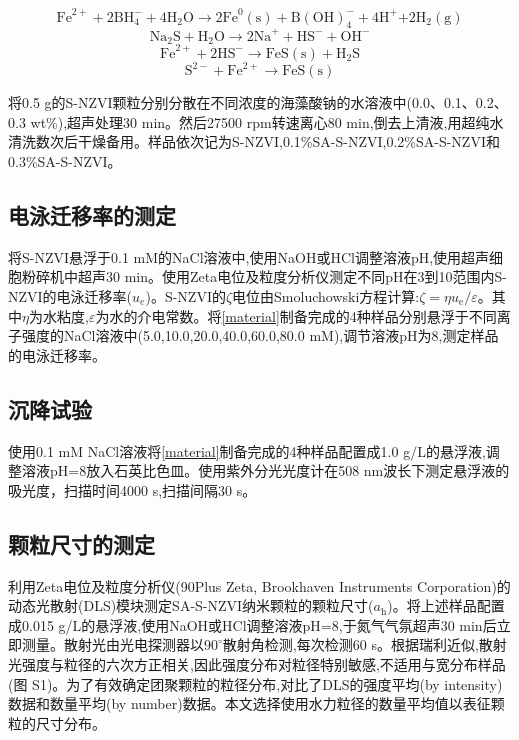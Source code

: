 \begin{equation}\label{eq1}
    \mathrm{{Fe}^{2+}+2{BH}_4^-+4H_2O}\rightarrow \mathrm{2{Fe}^0\left(s\right)+{B\left(OH\right)}_4^-+4H^+}\mathrm{+2H_2\left(g\right)}
\end{equation}
\begin{equation}
    \mathrm{{Na}_2S+H_2O\rightarrow2{Na}^++{HS}^-+{OH}^-}
\end{equation}
\begin{equation}
    \mathrm{{Fe}^{2+}+2{HS}^-\rightarrow FeS(s)+H_2S}
\end{equation}
\begin{equation}\label{e16}
    \mathrm{S^{2-}+{Fe}^{2+}\rightarrow FeS(s)}
\end{equation}

将0.5 g的S-NZVI颗粒分别分散在不同浓度的海藻酸钠的水溶液中(0.0、0.1、0.2、0.3 wt\%),超声处理30 min。然后27500 rpm转速离心80 min,倒去上清液,用超纯水清洗数次后干燥备用。样品依次记为S-NZVI,0.1\%SA-S-NZVI,0.2\%SA-S-NZVI和0.3\%SA-S-NZVI。

\subsection{电泳迁移率的测定}

将S-NZVI悬浮于0.1 mM的NaCl溶液中,使用NaOH或HCl调整溶液pH,使用超声细胞粉碎机中超声30 min。使用Zeta电位及粒度分析仪测定不同pH在3到10范围内S-NZVI的电泳迁移率($u_e$)。S-NZVI的$\zeta$电位由Smoluchowski方程计算:$\zeta=\eta u_\mathrm{e}/\varepsilon$。其中$\eta$为水粘度,$\varepsilon$为水的介电常数。将\cref{material}制备完成的4种样品分别悬浮于不同离子强度的NaCl溶液中(5.0,10.0,20.0,40.0,60.0,80.0 mM),调节溶液pH为8,测定样品的电泳迁移率。

\subsection{沉降试验}

使用0.1 mM NaCl溶液将\cref{material}制备完成的4种样品配置成1.0 g/L的悬浮液,调整溶液pH=8放入石英比色皿。使用紫外分光光度计在508 nm波长下测定悬浮液的吸光度，扫描时间4000 s,扫描间隔30 s。

\subsection{颗粒尺寸的测定}

利用Zeta电位及粒度分析仪(90Plus Zeta, Brookhaven Instruments Corporation)的动态光散射(DLS)模块测定SA-S-NZVI纳米颗粒的颗粒尺寸($a_\mathrm{h}$)。将上述样品配置成0.015 g/L的悬浮液,使用NaOH或HCl调整溶液pH=8,于氮气气氛超声30 min后立即测量。散射光由光电探测器以$90^\circ$散射角检测,每次检测60 s。根据瑞利近似,散射光强度与粒径的六次方正相关,因此强度分布对粒径特别敏感,不适用与宽分布样品(图 S1)。为了有效确定团聚颗粒的粒径分布,对比了DLS的强度平均(by intensity)数据和数量平均(by number)数据。本文选择使用水力粒径的数量平均值以表征颗粒的尺寸分布。


